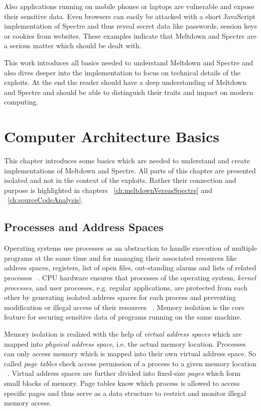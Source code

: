 \documentclass[a4paper,oneside,openright] {scrreprt}
\begin{document}
Also applications running on mobile phones or laptops are vulnerable and expose their sensitive data. 
Even browsers can easily be attacked with a short JavaScript implementation of Spectre and thus reveal secret data
like passwords, session keys or cookies from websites. These examples indicate that Meltdown and Spectre are a serious matter which should be dealt with.

This work introduces all basics needed to understand Meltdown and Spectre and also dives deeper into the implementation
to focus on technical details of the exploits. At the end the reader should have a deep understanding of Meltdown and Spectre
and should be able to distinguish their traits and impact on modern computing.

\chapter{Computer Architecture Basics}
\label{ch:basics}

This chapter introduces some basics which are needed to understand and create implementations of Meltdown and Spectre. 
All parts of this chapter are presented isolated and not in the context of the exploits. 
Rather their connection and purpose is highlighted in chapters ~\ref{ch:meltdownVersusSpectre} and ~\ref{ch:sourceCodeAnalysis}.

\section{Processes and Address Spaces}
\label{ch:intro:motivation}

Operating systems use processes as an abstraction to handle execution of multiple programs at the same time
 and for managing their associated resources like address spaces, registers, list of open files, 
 out-standing alarms and lists of related processes ~\cite{tanenbaum2009modern:39-41}. 
CPU hardware ensures that processes of the operating system, \textit{kernel processes}, 
and user processes, e.g. regular applications, are protected from each other by generating isolated address spaces for each process 
and preventing modification or illegal access of their resources ~\cite{silberschatz2012operating}.
Memory isolation is the core feature for securing sensitive data of programs running on the same machine.

Memory isolation is realized with the help of \textit{virtual address spaces} 
which are mapped into \textit{physical address space}, i.e. the actual memory location.
Processes can only access memory which is mapped into their own virtual address space.
So called \textit{page tables} check access permission of a process to a given memory location ~\cite{hennessy2011computer:105-107}.
Virtual address spaces are further divided into fixed-size \textit{pages} which form small blocks of memory.
Page tables know which process is allowed to access specific pages and thus serve as
a data structure to restrict and monitor illegal memory access.
\end{document}
